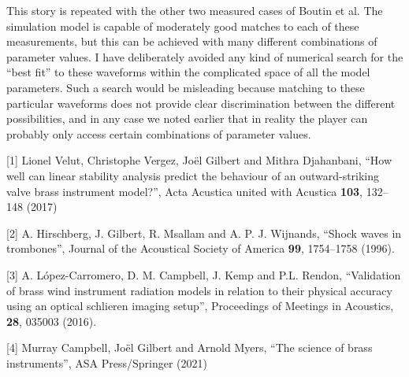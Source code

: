 
  This story is repeated with the other two measured cases of Boutin et al. The 
  simulation model is capable of moderately good matches to each of these 
  measurements, but this can be achieved with many different combinations of 
  parameter values. I have deliberately avoided any kind of numerical search 
  for the “best fit” to these waveforms within the complicated space of all the 
  model parameters. Such a search would be misleading because matching to these 
  particular waveforms does not provide clear discrimination between the 
  different possibilities, and in any case we noted earlier that in reality the 
  player can probably only access certain combinations of parameter values. 



  \sectionreferences{}[1] Lionel Velut, Christophe Vergez, Joël Gilbert and 
  Mithra Djahanbani, “How well can linear stability analysis predict the 
  behaviour of an outward-striking valve brass instrument model?”, Acta 
  Acustica united with Acustica \textbf{103}, 132–148 (2017) 

  [2] A. Hirschberg, J. Gilbert, R. Msallam and A. P. J. Wijnands, “Shock waves 
  in trombones”, Journal of the Acoustical Society of America \textbf{99}, 
  1754–1758 (1996). 

  [3] A. López-Carromero, D. M. Campbell, J. Kemp and P.L. Rendon, “Validation 
  of brass wind instrument radiation models in relation to their physical 
  accuracy using an optical schlieren imaging setup”, Proceedings of Meetings 
  in Acoustics, \textbf{28}, 035003 (2016). 

  [4] Murray Campbell, Joël Gilbert and Arnold Myers, “The science of brass 
  instruments”, ASA Press/Springer (2021) 

